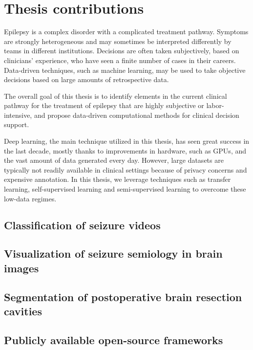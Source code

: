 \section{Thesis contributions}

Epilepsy is a complex disorder with a complicated treatment pathway.
Symptoms are strongly heterogeneous and may sometimes be interpreted differently by teams in different institutions.
Decisions are often taken subjectively, based on clinicians' experience, who have seen a finite number of cases in their careers.
Data-driven techniques, such as machine learning, may be used to take objective decisions based on large amounts of retrospective data.

The overall goal of this thesis is to identify elements in the current clinical pathway for the treatment of epilepsy that are highly subjective or labor-intensive, and propose data-driven computational methods for clinical decision support.

Deep learning, the main technique utilized in this thesis, has seen great success in the last decade, mostly thanks to improvements in hardware, such as \acp{GPU}, and the vast amount of data generated every day.
However, large datasets are typically not readily available in clinical settings because of privacy concerns and expensive annotation.
In this thesis, we leverage techniques such as transfer learning, self-supervised learning and semi-supervised learning to overcome these low-data regimes.


\subsection{Classification of seizure videos}

\subsection{Visualization of seizure semiology in brain images}

\subsection{Segmentation of postoperative brain resection cavities}

\subsection{Publicly available open-source frameworks}
